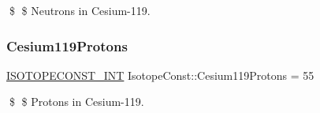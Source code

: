 \$ \$ Neutrons in Cesium-\/119. \mbox{\label{group___isotope_const-_cesium-_cs119_ga92a37a6b7179eabafb34daec15141c08}} 
\subsubsection{\texorpdfstring{Cesium119\+Protons}{Cesium119Protons}}
{\footnotesize\ttfamily \mbox{\hyperlink{group___isotope_const-_macros_ga5f18360b3e99483a35c32d789e62621c}{I\+S\+O\+T\+O\+P\+E\+C\+O\+N\+S\+T\+\_\+\+I\+NT}} Isotope\+Const\+::\+Cesium119\+Protons = 55}

\$ \$ Protons in Cesium-\/119. 